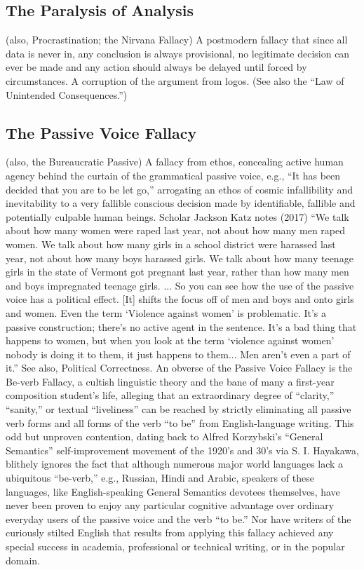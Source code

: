 \documentclass[10pt,a4paper,british]{article}
\begin{document}
\begin{multicols}{2}
    \subsection{The Paralysis of Analysis} (also, Procrastination; the Nirvana
    Fallacy) A postmodern fallacy that since all data is never in, any
    conclusion is always provisional, no legitimate decision can ever be made
    and any action should always be delayed until forced by circumstances. A
    corruption of the argument from logos. (See also the ``Law of Unintended
    Consequences.'')

	\subsection{The Passive Voice Fallacy} (also, the Bureaucratic Passive) A
	fallacy from ethos, concealing active human agency behind the curtain of
	the grammatical passive voice, e.g., ``It has been decided that you are to
	be let go,'' arrogating an ethos of cosmic infallibility and inevitability
	to a very fallible conscious decision made by identifiable, fallible and
	potentially culpable human beings. Scholar Jackson Katz notes (2017) ``We
	talk about how many women were raped last year, not about how many men
	raped women. We talk about how many girls in a school district were
	harassed last year, not about how many boys harassed girls. We talk about
	how many teenage girls in the state of Vermont got pregnant last year,
	rather than how many men and boys impregnated teenage girls. ...  So you
	can see how the use of the passive voice has a political effect. [It]
	shifts the focus off of men and boys and onto girls and women. Even the
	term `Violence against women' is problematic. It's a passive construction;
	there's no active agent in the sentence. It's a bad thing that happens to
	women, but when you look at the term `violence against women' nobody is
	doing it to them, it just happens to them... Men aren't even a part of
	it.''  See also, Political Correctness. An obverse of the Passive Voice
	Fallacy is the Be{-}verb Fallacy, a cultish linguistic theory and the bane
	of many a first{-}year composition student's life, alleging that an
	extraordinary degree of ``clarity,'' ``sanity,'' or textual ``liveliness''
	can be reached by strictly eliminating all passive verb forms and all forms
	of the verb ``to be'' from English{-}language writing. This odd but
	unproven contention, dating back to Alfred Korzybski's ``General
	Semantics'' self{-}improvement movement of the 1920's and 30's via S. I.
	Hayakawa, blithely ignores the fact that although numerous major world
	languages lack a ubiquitous ``be{-}verb,'' e.g., Russian, Hindi and Arabic,
	speakers of these languages, like English{-}speaking General Semantics
	devotees themselves, have never been proven to enjoy any particular
	cognitive advantage over ordinary everyday users of the passive voice and
	the verb ``to be.'' Nor have writers of the curiously stilted English that
	results from applying this fallacy achieved any special success in
	academia, professional or technical writing, or in the popular domain.


\end{multicols}
\end{document}
